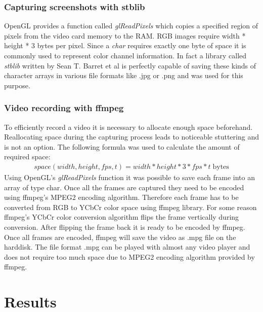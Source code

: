 \documentclass[11pt,a4paper,twoside,openright]{report}
\begin{document}
\subsection{Capturing screenshots with stblib}
OpenGL provides a function called \emph{glReadPixels} which copies a specified region of pixels from the video card memory to the RAM. RGB images require width * height * 3 bytes per pixel. Since a \emph{char} requires exactly one byte of space it is commonly used to represent color channel information. In fact a library called \emph{stblib} written by Sean T. Barret et al is perfectly capable of saving these kinds of character arrays in various file formats like .jpg or .png and was used for this purpose.

\subsection{Video recording with ffmpeg}
To efficiently record a video it is necessary to allocate enough space beforehand. Reallocating space during the capturing process leads to noticeable stuttering and is not an option. The following formula was used to calculate the amount of required space:
\begin{align*}
space(width, height, fps, t) = width * height * 3 * fps * t \; \mathrm{bytes}
\end{align*}
Using OpenGL's \emph{glReadPixels} function it was possible to save each frame into an array of type char. Once all the frames are captured they need to be encoded using ffmpeg's MPEG2 encoding algorithm. Therefore each frame has to be converted from RGB to YCbCr color space using ffmpeg library. For some reason ffmpeg's YCbCr color conversion algorithm flips the frame vertically during conversion. After flipping the frame back it is ready to be encoded by ffmpeg. Once all frames are encoded, ffmpeg will save the video as .mpg file on the harddisk. The file format .mpg can be played with almost any video player and does not require too much space due to MPEG2 encoding algorithm provided by ffmpeg.

\chapter{Results}
\label{sec:results}
\end{document}
